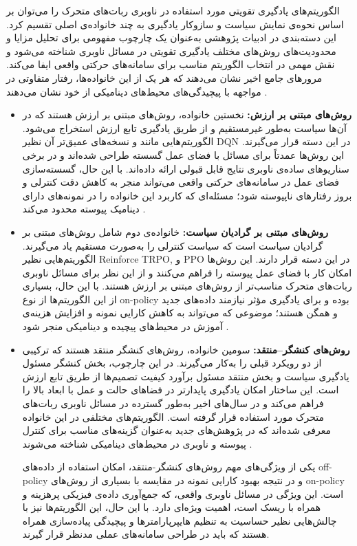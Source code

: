 الگوریتم‌های یادگیری تقویتی مورد استفاده در ناوبری ربات‌های متحرک را می‌توان بر اساس نحوه‌ی نمایش سیاست و سازوکار یادگیری به چند خانواده‌ی اصلی تقسیم کرد. این دسته‌بندی در ادبیات پژوهشی به‌عنوان یک چارچوب مفهومی برای تحلیل مزایا و محدودیت‌های روش‌های مختلف  یادگیری تقویتی در مسائل ناوبری شناخته می‌شود و نقش مهمی در انتخاب الگوریتم مناسب برای سامانه‌های حرکتی واقعی ایفا می‌کند. مرورهای جامع اخیر نشان می‌دهند که هر یک از این خانواده‌ها، رفتار متفاوتی در مواجهه با پیچیدگی‌های محیط‌های دینامیکی از خود نشان می‌دهند %
\cite{Le2024DRLNavigationSurvey, Alsolami2025AutonomousNavigationSurvey}.
\begin{itemize}
\item{\textbf{روش‌های مبتنی بر ارزش:}}
نخستین خانواده، روش‌های مبتنی بر ارزش%
 هستند که در آن‌ها سیاست به‌طور غیرمستقیم و از طریق یادگیری تابع ارزش  استخراج می‌شود. الگوریتم‌هایی مانند 
 و نسخه‌های عمیق‌تر آن نظیر DQN در این دسته قرار می‌گیرند. این روش‌ها عمدتاً برای مسائل با فضای عمل گسسته طراحی شده‌اند و در برخی سناریوهای ساده‌ی ناوبری نتایج قابل قبولی ارائه داده‌اند. با این حال، گسسته‌سازی فضای عمل در سامانه‌های حرکتی واقعی می‌تواند منجر به کاهش دقت کنترلی و بروز رفتارهای ناپیوسته شود؛ مسئله‌ای که کاربرد این خانواده را در نمونه‌های دارای دینامیک پیوسته محدود می‌کند %
\cite{Alsolami2025AutonomousNavigationSurvey}.

\item{\textbf{روش‌های مبتنی بر گرادیان سیاست:}}
خانواده‌ی دوم شامل روش‌های مبتنی بر گرادیان سیاست%
 است که سیاست کنترلی را به‌صورت مستقیم یاد می‌گیرند. الگوریتم‌هایی نظیر Reinforce TRPO, و PPO در این دسته قرار دارند. این روش‌ها امکان کار با فضای عمل پیوسته را فراهم می‌کنند و از این نظر برای مسائل ناوبری ربات‌های متحرک مناسب‌تر از روش‌های مبتنی بر ارزش هستند. با این حال، بسیاری از این الگوریتم‌ها از نوع on-policy بوده و برای یادگیری مؤثر نیازمند داده‌های جدید و همگن هستند؛ موضوعی که می‌تواند به کاهش کارایی نمونه و افزایش هزینه‌ی آموزش در محیط‌های پیچیده و دینامیکی منجر شود %
\cite{Kober2013RLRobotics,Le2024DRLNavigationSurvey}.

\item{\textbf{روش‌های کنشگر--منتقد:}}
سومین خانواده، روش‌های کنشگر منتقد هستند که ترکیبی از دو رویکرد قبلی را به‌کار می‌گیرند. در این چارچوب، بخش کنشگر مسئول یادگیری سیاست و بخش منتقد مسئول برآورد کیفیت تصمیم‌ها از طریق تابع ارزش است. این ساختار امکان یادگیری پایدارتر در فضاهای حالت و عمل با ابعاد بالا را فراهم می‌کند و در سال‌های اخیر به‌طور گسترده در مسائل ناوبری ربات‌های متحرک مورد استفاده قرار گرفته است. الگوریتم‌های مختلفی در این خانواده معرفی شده‌اند که در پژوهش‌های جدید به‌عنوان گزینه‌های مناسب برای کنترل پیوسته و ناوبری در محیط‌های دینامیکی شناخته می‌شوند %
\cite{Le2024DRLNavigationSurvey, Alsolami2025AutonomousNavigationSurvey}.

یکی از ویژگی‌های مهم روش‌های کنشگر-منتقد، امکان استفاده از داده‌های off-policy و در نتیجه بهبود کارایی نمونه در مقایسه با بسیاری از روش‌های on-policy است. این ویژگی در مسائل ناوبری واقعی، که جمع‌آوری داده‌ی فیزیکی پرهزینه و همراه با ریسک است، اهمیت ویژه‌ای دارد. با این حال، این الگوریتم‌ها نیز با چالش‌هایی نظیر حساسیت به تنظیم هایپرپارامترها و پیچیدگی پیاده‌سازی همراه هستند که باید در طراحی سامانه‌های عملی مدنظر قرار گیرند.
\end{itemize}


